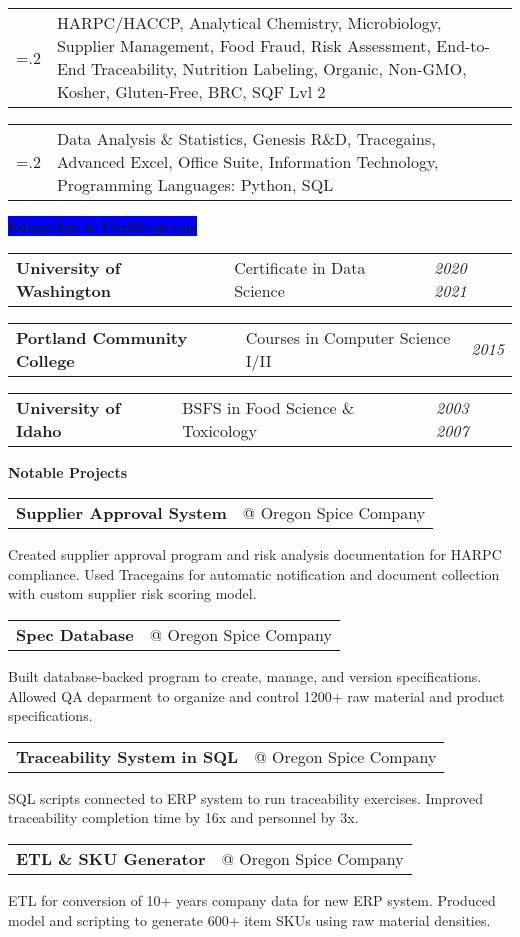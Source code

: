 \documentclass[letterpaper,12pt]{article}[leftmargin=*]
\makeatletter
\newcommand{\projects}[2]{\vspace{4pt}
  \colorbox{Copper}{\color{white}#1\hspace{9pt}\raggedbottom\normalsize\textbf{#2\hspace{4pt}}}
}
\newcommand{\education}[2]{\vspace{4pt}
  \colorbox{Blue}{\color{white}#1\hspace{9pt}\raggedbottom\normalsize\textbf{#2\hspace{4pt}}}
}
\newcommand{\resumeSectionStart}{\begin{itemize}[leftmargin=0.1in]}
\newcommand{\resumeSectionEnd}{\end{itemize}}
\newcommand{\resumeProject}[3]{
  \vspace{-6pt}\item[]
    \begin{tabularx}{0.97\textwidth}{X@{\hspace{60pt}} r}
      \textbf{\color{primary}#1} & {\color{accent}\small#2} \\
    \end{tabularx}
    {#3}
}
\newcommand{\resumeSkill}[2]{
  \vspace{-6pt}
  \item[]
    \begin{tabularx}{0.97\textwidth}{>{\hsize=.2\hsize}X X }
      {\textbf{#1}} & {\small#2} \\
    \end{tabularx}
}
\newcommand{\resumeEducation}[3]{
  \vspace{-6pt}
  \item[]
    \begin{tabularx}{0.97\textwidth}[t]{>{\raggedright}X >{\raggedright\arraybackslash}X >{\raggedleft\arraybackslash}X}
      \textbf{\color{primary}#1} & {\small#2} & \textit{\color{accent}\small#3} \\
    \end{tabularx}
}
\makeatother
\begin{document}
\resumeSectionStart{
  \resumeSkill{Food Science}{HARPC/HACCP, Analytical Chemistry, Microbiology, Supplier Management, Food Fraud, Risk Assessment, End-to-End Traceability, Nutrition Labeling,  Organic, Non-GMO, Kosher, Gluten-Free, BRC, SQF Lvl 2}
  \resumeSkill{Other Skills}{Data Analysis \& Statistics, Genesis R\&D, Tracegains, Advanced Excel, Office Suite, Information Technology, Programming Languages: Python, SQL}
}
\resumeSectionEnd{}

\education{\faGraduationCap}{Education \& Certifications}
\resumeSectionStart{
  \resumeEducation{University of Washington}{Certificate in Data Science}{2020 \textemdash{} 2021}
  \resumeEducation{Portland Community College}{Courses in Computer Science I/II}{2015}
  \resumeEducation{University of Idaho}{BSFS in Food Science \& Toxicology}{2003 \textemdash{} 2007}
}
\resumeSectionEnd{}

\projects{\faFlask}{Notable Projects}

\resumeSectionStart{
  \resumeProject{Supplier Approval System}{@ Oregon Spice Company}{Created supplier approval program and risk analysis documentation for HARPC compliance. Used Tracegains for automatic notification and document collection with custom supplier risk scoring model.}
  \resumeProject{Spec Database}{@ Oregon Spice Company}{Built database-backed program to create, manage, and version specifications. Allowed QA deparment to organize and control 1200+ raw material and product specifications.}
  \resumeProject{Traceability System in SQL}{@ Oregon Spice Company}{SQL scripts connected to ERP system to run traceability exercises. Improved traceability completion time by 16x and personnel by 3x.}
  \resumeProject{ETL \& SKU Generator}{@ Oregon Spice Company}{ETL for conversion of 10+ years company data for new ERP system. Produced model and scripting to generate 600+ item SKUs using raw material densities.}
}
\resumeSectionEnd{}
\end{document}
